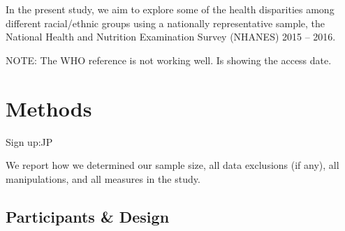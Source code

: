 \documentclass[man]{apa6}
\begin{document}
In the present study, we aim to explore some of the health disparities
among different racial/ethnic groups using a nationally representative
sample, the National Health and Nutrition Examination Survey (NHANES)
2015 -- 2016.

NOTE: The WHO reference is not working well. Is showing the access date.

\section{Methods}\label{methods}

Sign up:JP

We report how we determined our sample size, all data exclusions (if
any), all manipulations, and all measures in the study.

\subsection{Participants \& Design}\label{participants-design}
\end{document}
